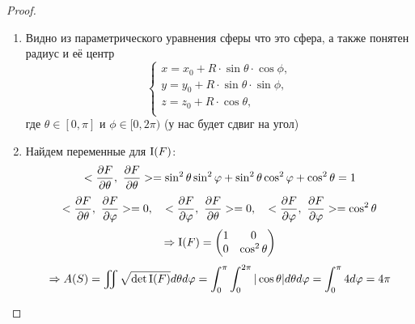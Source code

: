 \documentclass[main]{subfiles}
\begin{document}
    \begin{proof}
      \begin{enumerate}
        \item Видно из параметрического уравнения сферы что это сфера, а также понятен радиус и её центр
        \[\begin{cases}
          x = x_0 + R \cdot \sin \theta\cdot \cos \phi,\\
          y = y_0 + R \cdot \sin \theta\cdot \sin \phi,\\
          z = z_0 + R \cdot \cos \theta,\\
        \end{cases}\]
        где $\theta \in [0, \pi]$ и $\phi \in [0, 2\pi)$ (у нас будет сдвиг на угол)
        \item Найдем переменные для $\RNumb{1}(F)$:
        \[<\frac{\partial F}{\partial \theta},\ \frac{\partial F}{\partial \theta}> = \sin^2 \theta \sin^2 \varphi + \sin^2 \theta \cos^2 \varphi + \cos^2 \theta = 1\]
        \[<\frac{\partial F}{\partial \theta},\ \frac{\partial F}{\partial \varphi}> = 0,\quad <\frac{\partial F}{\partial \varphi},\ \frac{\partial F}{\partial \theta}> = 0,\quad <\frac{\partial F}{\partial \varphi},\ \frac{\partial F}{\partial \varphi}> = \cos^2 \theta\]
        \[\Ra \RNumb{1}(F)=\begin{pmatrix}
          1 & 0\\
          0 & \cos^2 \theta
        \end{pmatrix}\]
        \[\Ra A(S) = \iint \sqrt{\det \RNumb{1}(F)} d\theta d\varphi = \int_0^\pi \int_0^{2\pi} |\cos \theta|d\theta d\varphi = \int_0^\pi 4 d\varphi = 4 \pi\]
      \end{enumerate}
    \end{proof}
\end{document}
